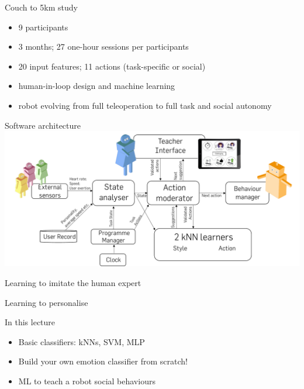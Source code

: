 \documentclass[compress,xcolor=table]{beamer}
\makeatletter
\def\beamer@writeslidentry@miniframesoff{%
  \expandafter\beamer@ifempty\expandafter{\beamer@framestartpage}{}%
  {%
    \clearpage\beamer@notesactions%
  }
}
\newcommand*{\miniframesoff}{\let\beamer@writeslidentry=\beamer@writeslidentry@miniframesoff}
\makeatother
\begin{document}
\begin{frame}{Couch to 5km study}
    \begin{itemize}
        \item 9 participants
        \item 3 months; 27 one-hour sessions per participants
        \item 20 input features; 11 actions (task-specific or social)
        \item human-in-loop design and machine learning
        \item robot evolving from full teleoperation to full task and social
            autonomy
    \end{itemize}

\end{frame}

\begin{frame}{Software architecture}
        \centering
        \includegraphics[width=\linewidth]{couch25k/architecture.pdf}

\end{frame}

{
\begin{frame}{Learning to imitate the human expert}
\end{frame}
}
{
\begin{frame}{Learning to personalise}
\end{frame}
}


\miniframesoff

\begin{frame}{In this lecture}

\begin{itemize}
    \item Basic classifiers: kNNs, SVM, MLP
    \item Build your own emotion classifier from scratch!
    \item ML to teach a robot social behaviours

\end{itemize}

\end{frame}
\end{document}
